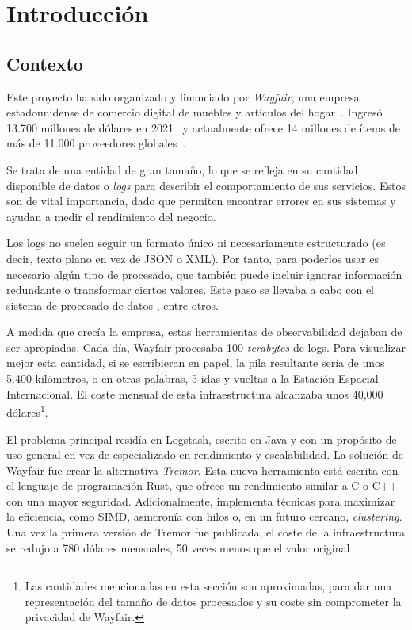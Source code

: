 
\chapter{Introducción}

\section{Contexto}

Este proyecto ha sido organizado y financiado por \emph{Wayfair}, una empresa
estadounidense de comercio digital de muebles y artículos del
hogar~\cite{wayfair}. Ingresó 13.700 millones de dólares en
2021~\cite{wayfairRevenue} y actualmente ofrece 14 millones de ítems de más de
11.000 proveedores globales~\cite{wayfairItems}.

Se trata de una entidad de gran tamaño, lo que se refleja en su cantidad
disponible de datos o \emph{logs} para describir el comportamiento de sus
servicios. Estos son de vital importancia, dado que permiten encontrar errores
en sus sistemas y ayudan a medir el rendimiento del negocio.

Los logs no suelen seguir un formato único ni necesariamente estructurado (es
decir, texto plano en vez de JSON o XML). Por tanto, para poderlos usar es
necesario algún tipo de procesado, que también puede incluir ignorar información
redundante o transformar ciertos valores. Este paso se llevaba a cabo con el
sistema de procesado de datos , entre otros.

A medida que crecía la empresa, estas herramientas de observabilidad dejaban de
ser apropiadas. Cada día, Wayfair procesaba 100 \emph{terabytes} de logs. Para
visualizar mejor esta cantidad, si se escribieran en papel, la pila resultante
sería de unos 5.400 kilómetros, o en otras palabras, 5 idas y vueltas a la
Estación Espacial Internacional. El coste mensual de esta infraestructura
alcanzaba unos 40,000 dólares\footnote{Las cantidades mencionadas en esta
sección son aproximadas, para dar una representación del tamaño de datos
procesados y su coste sin comprometer la privacidad de Wayfair.}.

El problema principal residía en Logstash, escrito en Java y con un propósito de
uso general en vez de especializado en rendimiento y escalabilidad. La solución
de Wayfair fue crear la alternativa \emph{Tremor}. Esta nueva herramienta está
escrita con el lenguaje de programación Rust, que ofrece un rendimiento similar
a C o C++ con una mayor seguridad. Adicionalmente, implementa técnicas para
maximizar la eficiencia, como SIMD, asincronía con hilos o, en un futuro
cercano, \emph{clustering}. Una vez la primera versión de Tremor fue publicada,
el coste de la infraestructura se redujo a 780 dólares mensuales, 50 veces menos
que el valor original~\cite{tremorcon_lll}.

